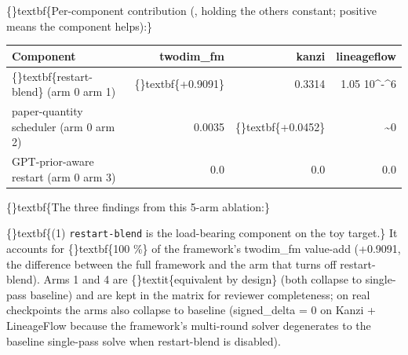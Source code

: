 \documentclass{article}
\begin{document}
\begin{table}[ht]
\centering
\small
{}%
\end{table}

\{\}textbf\{Per-component contribution (, holding the others constant; positive means the component helps):\}

\begin{table}[ht]
\centering
\small
\begin{tabular}{lrrr}
\hline
\textbf{Component} & \textbf{twodim\_fm} & \textbf{kanzi} & \textbf{lineageflow} \\
\hline
\{\}textbf\{restart-blend\} (arm 0  arm 1) & \{\}textbf\{+0.9091\} & 0.3314 & 1.05  10\textasciicircum{}-\textasciicircum{}6 \\
paper-quantity scheduler (arm 0  arm 2) & 0.0035 & \{\}textbf\{+0.0452\} & \textasciitilde{}0 \\
GPT-prior-aware restart (arm 0  arm 3) & 0.0 & 0.0 & 0.0 \\
\hline
\end{tabular}
\end{table}

\{\}textbf\{The three findings from this 5-arm ablation:\}

\{\}textbf\{(1) \texttt{restart-blend} is the load-bearing component on the toy target.\} It accounts for \{\}textbf\{100 \%\} of the framework's twodim\_fm value-add (+0.9091, the difference between the full framework and the arm that turns off restart-blend). Arms 1 and 4 are \{\}textit\{equivalent by design\} (both collapse to single-pass baseline) and are kept in the matrix for reviewer completeness; on real checkpoints the arms also collapse to baseline (signed\_delta = 0 on Kanzi + LineageFlow because the framework's multi-round solver degenerates to the baseline single-pass solve when restart-blend is disabled).
\end{document}
